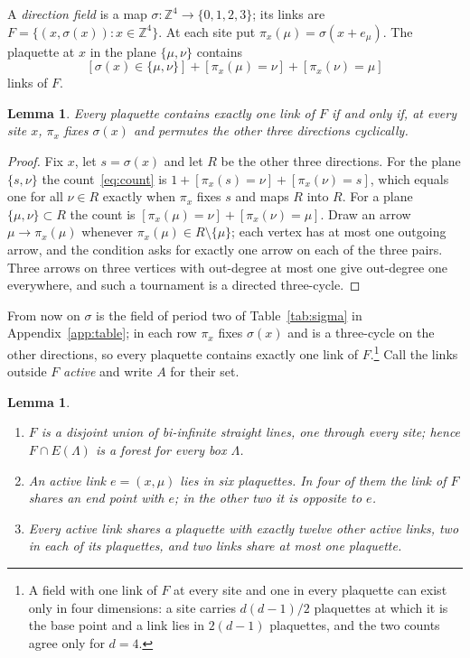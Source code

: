 \documentclass[11pt]{amsart}
\newtheorem{lemma}[theorem]{Lemma}
\theoremstyle{definition}
\theoremstyle{remark}
\numberwithin{equation}{section}
\newcommand{\Z}{\mathbb{Z}}
\begin{document}
A \emph{direction field} is a map $\sigma:\Z^4\to\{0,1,2,3\}$; its links
are $F=\{(x,\sigma(x)):x\in\Z^4\}$. At each site put $\pi_x(\mu)=
\sigma(x+e_\mu)$. The plaquette at $x$ in the plane $\{\mu,\nu\}$ contains
\begin{equation}\label{eq:count}
[\sigma(x)\in\{\mu,\nu\}]+[\pi_x(\mu)=\nu]+[\pi_x(\nu)=\mu]
\end{equation}
links of $F$.

\begin{lemma}\label{lem:cycle}
Every plaquette contains exactly one link of $F$ if and only if, at every
site $x$, $\pi_x$ fixes $\sigma(x)$ and permutes the other three directions
cyclically.
\end{lemma}

\begin{proof}
Fix $x$, let $s=\sigma(x)$ and let $R$ be the other three directions. For the
plane $\{s,\nu\}$ the count~\eqref{eq:count} is $1+[\pi_x(s)=\nu]+[\pi_x(\nu)
=s]$, which equals one for all $\nu\in R$ exactly when $\pi_x$ fixes $s$ and
maps $R$ into $R$. For a plane $\{\mu,\nu\}\subset R$ the count is
$[\pi_x(\mu)=\nu]+[\pi_x(\nu)=\mu]$. Draw an arrow $\mu\to\pi_x(\mu)$ whenever
$\pi_x(\mu)\in R\setminus\{\mu\}$; each vertex has at most one outgoing arrow,
and the condition asks for exactly one arrow on each of the three pairs. Three
arrows on three vertices with out-degree at most one give out-degree one
everywhere, and such a tournament is a directed three-cycle.
\end{proof}

From now on $\sigma$ is the field of period two of Table~\ref{tab:sigma} in
Appendix~\ref{app:table}; in each row $\pi_x$ fixes $\sigma(x)$ and is a
three-cycle on the other directions, so every plaquette contains exactly one
link of $F$.\footnote{A field with one link of $F$ at every site and one in
every plaquette can exist only in four dimensions: a site carries
$d(d-1)/2$ plaquettes at which it is the base point and a link lies in
$2(d-1)$ plaquettes, and the two counts agree only for $d=4$.} Call the links
outside $F$ \emph{active} and write $A$ for their set.

\begin{lemma}\label{lem:structure}\leavevmode
\begin{enumerate}[label=\textup{(\roman*)},leftmargin=*]
\item $F$ is a disjoint union of bi-infinite straight lines, one through every
site; hence $F\cap E(\Lambda)$ is a forest for every box $\Lambda$.
\item An active link $e=(x,\mu)$ lies in six plaquettes. In four of them the
link of $F$ shares an end point with $e$; in the other two it is opposite to
$e$.
\item Every active link shares a plaquette with exactly twelve other active
links, two in each of its plaquettes, and two links share at most one
plaquette.
\end{enumerate}
\end{lemma}
\end{document}
